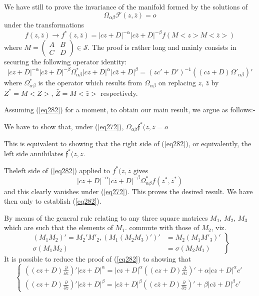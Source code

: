 We have still to prove the invariance of the manifold formed by the
solutions of   
\begin{equation*}
\Omega_{\alpha \beta}\mathscr {F} (z,\bar{z})=o \tag*{$(272)'$}\label{eq272'}   
\end{equation*}
under the transformations
\begin{equation*}
f(z,\bar{z}) \to f^\ast(z,\bar{z})=|cz+D|^{- \alpha}|c
\bar{z}+D|^{-\beta}f(M < z > M<\bar{z}>) \tag*{$(273)'$}\label{eq273'} 
\end{equation*}
where $M= \begin{pmatrix} A & B \\ C & D \end{pmatrix} \in
\mathcal{S}$. The proof is rather long and mainly consists in securing
the following operator identity: 
\begin{equation*}
|cz+D|^{-\alpha}|c\bar{z}+D|^{-\beta} \Omega^*_{\alpha
  \beta}|cz+D|^\alpha
|c\bar{z}+D|^{\beta}=(zc'+D')^{-1}((cz+D)\Omega'_{\alpha \beta})'
\tag{282}\label{eq282}    
\end{equation*}
where $\Omega^*_{\alpha \beta}$ is the operator which results from
$\Omega_{\alpha \beta}$ on replacing $z$, $\bar{z}$ by $Z^*=M< Z
>$, $\bar{Z}=M< \bar{z}>$ respectively. 

Assuming (\ref{eq282}) for a moment, to obtain our main result, we argue as
follows:- 

We have to show that, under (\ref{eq272}), $\Omega_{\alpha \beta}
\mathfrak{f}^*(z,\bar{z}=o$ 

This is equivalent to showing that the right side of (\ref{eq282}), or
equivalently, the left side annihilates $\mathfrak{f}^* (z,\bar{z}$. 

The\pageoriginale left side of (\ref{eq282}) applied to
$f^*(z,\bar{z}$ gives 
$$
|cz+D|^{-\alpha}|c\bar{z}+D|^{-\beta}\Omega^*_{\alpha
  \beta}f(z^*,\bar{z}^*) 
$$
and this clearly vanishes under (\ref{eq272}). This proves the desired
result. We have then only to establish (\ref{eq282}). 

By means of the general rule relating to any three square matrices
$M_1$, $M_2$, $M_3$ which are such that the elements of $M_1$. commute
with those of $M_2$, viz. 
\begin{equation*}
\left. \tag{283}\label{eq283}   
\begin{aligned}
(M_1M_2)'=M_2'M'_2,(M_1(M_2 M_3)')' & =M_2(M_1M'_3)'\\ 
\sigma(M_1M_2) & =\sigma(M_2M_1)
\end{aligned}
\right \}
\end{equation*}
It is possible to reduce the proof of (\ref{eq282}) to showing that 
\begin{equation*}
\begin{cases}
((cz+D)\frac{\partial}{\partial z})'|cz+D|^\alpha = |cz+D|^\alpha
  ((cz+D)\frac{\partial}{\partial z})'+\alpha |cz+D|^\alpha c'\\[5pt] 
((cz+D)\frac{\partial}{\partial z})'|c \bar{z}+D|^\beta = |c
  \bar{z}+D|^\beta ((c \bar{z}+D)\frac{\partial}{\partial
    \bar{z}})'+\beta |c\bar{z}+D|^\beta c'
\end{cases}\tag{284}\label{eq284}   
\end{equation*}

